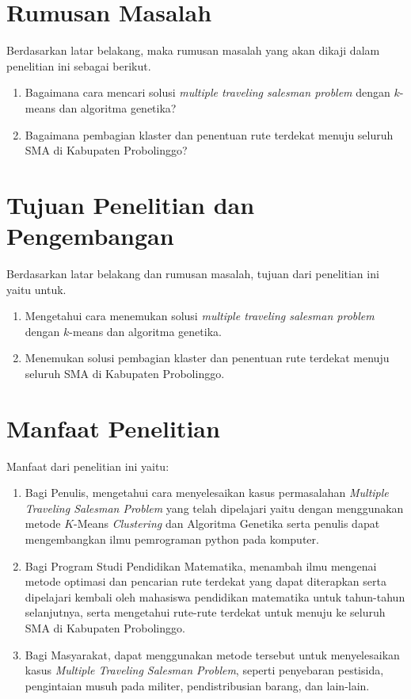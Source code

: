 \section{Rumusan Masalah}

Berdasarkan latar belakang, maka rumusan masalah yang akan dikaji dalam penelitian ini sebagai berikut.
\begin{enumerate}
    \item Bagaimana cara mencari solusi \textit{multiple traveling salesman problem} dengan $k$-means dan algoritma genetika?
    \item Bagaimana pembagian klaster dan penentuan rute terdekat menuju seluruh SMA di Kabupaten Probolinggo?
\end{enumerate}

\section{Tujuan Penelitian dan Pengembangan}

Berdasarkan latar belakang dan rumusan masalah, tujuan dari penelitian ini yaitu untuk.
\begin{enumerate}
	\item Mengetahui cara menemukan solusi \textit{multiple traveling salesman problem} dengan $k$-means dan algoritma genetika.
	\item Menemukan solusi pembagian klaster dan penentuan rute terdekat menuju seluruh SMA di Kabupaten Probolinggo.
\end{enumerate}

\section{Manfaat Penelitian}

Manfaat dari penelitian ini yaitu:
\begin{enumerate}
	\item Bagi Penulis, mengetahui cara menyelesaikan kasus permasalahan \textit{Multiple Traveling Salesman Problem} yang telah dipelajari yaitu dengan menggunakan metode $K$-Means \textit{Clustering} dan Algoritma Genetika serta penulis dapat mengembangkan ilmu pemrograman python pada komputer.

	\item Bagi Program Studi Pendidikan Matematika, menambah ilmu mengenai metode optimasi dan pencarian rute terdekat yang dapat diterapkan serta dipelajari kembali oleh mahasiswa pendidikan matematika untuk tahun-tahun selanjutnya, serta mengetahui rute-rute terdekat untuk menuju ke seluruh SMA di Kabupaten Probolinggo.
	
	\item Bagi Masyarakat, dapat menggunakan metode tersebut untuk menyelesaikan kasus \textit{Multiple Traveling Salesman Problem}, seperti penyebaran pestisida, pengintaian musuh pada militer, pendistribusian barang, dan lain-lain.
	
\end{enumerate}

